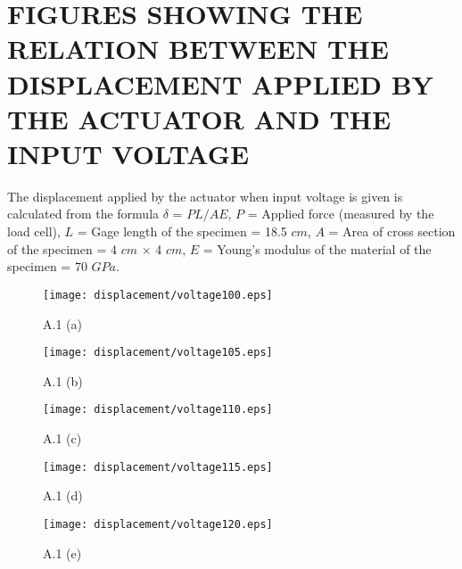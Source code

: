 
\section{FIGURES SHOWING THE RELATION BETWEEN THE DISPLACEMENT APPLIED BY THE ACTUATOR AND THE INPUT VOLTAGE}
The displacement applied by the actuator when input voltage is given is calculated from the formula $\delta$ = ${PL/AE}$, $P$ = Applied force (measured by the load cell), $L$ = Gage length of the specimen = 18.5 $cm$, $A$ = Area of cross section of the specimen = 4 $cm$ $\times$ 4 $cm$, $E$ = Young's modulus of the material of the specimen = 70 $GPa$.
%
\vspace{1.5in}
\begin{figure}[H]
\centering
\begin{minipage}{0.8\textwidth}
\begin{centering}
\texttt{[image: displacement/voltage100.eps]}
\centerline{A.1 (a)}
\end{centering}
\end{minipage}
\end{figure}
%
\begin{figure}
\centering
\begin{minipage}{0.8\textwidth}
\begin{centering}
\texttt{[image: displacement/voltage105.eps]}
\centerline{A.1 (b)}
\end{centering}
\vspace{1in}
\end{minipage}
\begin{minipage}{0.8\textwidth}
\begin{centering}
\texttt{[image: displacement/voltage110.eps]}
\centerline{A.1 (c)}
\end{centering}
\end{minipage}
\end{figure}
%
\vspace{0.5in}
\begin{figure}
\centering
\begin{minipage}{0.8\textwidth}
\begin{centering}
\texttt{[image: displacement/voltage115.eps]}
\centerline{\hspace{3mm}A.1 (d)}
\end{centering}
\vspace{1in}
\end{minipage}
\begin{minipage}{0.8\textwidth}
\begin{centering}
\texttt{[image: displacement/voltage120.eps]}
\centerline{A.1 (e)}
\end{centering}
\end{minipage}
\end{figure}
